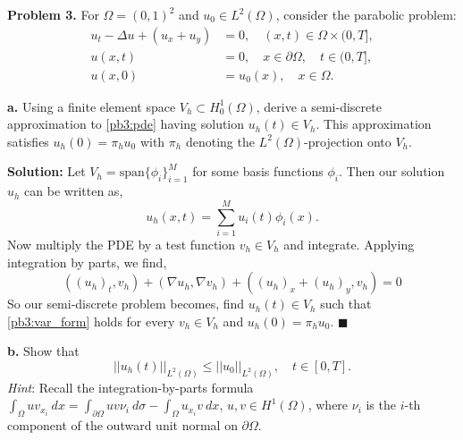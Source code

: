 \documentclass[11pt]{article}
\begin{document}
\vskip 2cm



\textbf{Problem 3.} For $\Omega = (0,1)^2$ and $u_0 \in L^2(\Omega)$, consider the parabolic problem:
\begin{equation} \label{pb3:pde}
\begin{split}
    u_t - \Delta u + (u_x + u_y)&= 0, \quad (x,t) \in \Omega \times (0,T], \\
    u(x,t) &= 0, \quad x \in \partial\Omega, \quad t \in (0,T], \\
    u(x,0) &= u_0(x), \quad x \in \Omega.
\end{split}
\end{equation}

\vskip 1cm


\textbf{a.} Using a finite element space $V_h \subset H^1_0(\Omega)$, derive a semi-discrete approximation to \eqref{pb3:pde} having solution $u_h(t) \in V_h$.
This approximation satisfies $u_h(0) = \pi_h u_0$ with $\pi_h$ denoting the $L^2(\Omega)$-projection onto $V_h$.


\vskip 1cm

\textbf{Solution:} Let $V_h = \text{span}\{\phi_i\}_{i=1}^M$ for some basis functions $\phi_i$.
Then our solution $u_h$ can be written as,
\begin{equation*}
    u_h(x,t) = \sum_{i=1}^M u_i(t) \phi_i(x).
\end{equation*}
Now multiply the PDE by a test function $v_h \in V_h$ and integrate.
Applying integration by parts, we find,
\begin{equation} \label{pb3:var_form}
    ((u_h)_t, v_h) + (\nabla u_h, \nabla v_h) + ((u_h)_x + (u_h)_y, v_h) = 0
\end{equation}
So our semi-discrete problem becomes, find $u_h(t) \in V_h$ such that \eqref{pb3:var_form} holds for every $v_h \in V_h$ and $u_h(0) = \pi_h u_0$. 
$\blacksquare$



\vskip 2cm


\textbf{b.} Show that
\begin{equation}
    ||u_h(t)||_{L^2(\Omega)} \leq ||u_0||_{L^2(\Omega)}, \quad t \in [0,T].
\end{equation}
\textit{Hint}: Recall the  integration-by-parts  formula $\int_\Omega uv_{x_i} \: dx = \int_{\partial \Omega} uv\nu_i \: d\sigma - \int_{\Omega} u_{x_i} v \: dx$, $u,v \in H^1(\Omega)$, where $\nu_i$ is the $i$-th component of the outward unit normal on $\partial \Omega$.
\end{document}
